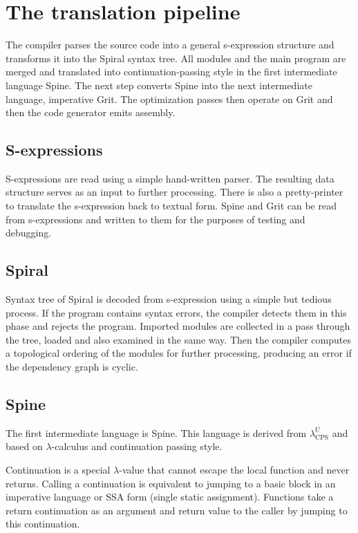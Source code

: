 \chapter{The translation pipeline}

The compiler parses the source code into a general s-expression structure and
transforms it into the Spiral syntax tree. All modules and the main program are
merged and translated into continuation-passing style in the first intermediate
language Spine. The next step converts Spine into the next intermediate
language, imperative Grit. The optimization passes then operate on Grit and then
the code generator emits assembly.

\section{S-expressions}

S-expressions are read using a simple hand-written parser. The resulting data
structure serves as an input to further processing. There is also a
pretty-printer to translate the s-expression back to textual form. Spine and
Grit can be read from s-expressions and written to them for the purposes of
testing and debugging.

\section{Spiral}

Syntax tree of Spiral is decoded from s-expression using a simple but tedious
process. If the program contains syntax errors, the compiler detects them in
this phase and rejects the program. Imported modules are collected in a pass
through the tree, loaded and also examined in the same way. Then the compiler
computes a topological ordering of the modules for further processing, producing
an error if the dependency graph is cyclic.

\section{Spine}

The first intermediate language is Spine. This language is derived from
$\lambda^U_\text{CPS}$ \cite{kennedy2007compiling} and based on
$\lambda$-calculus and continuation passing style.

Continuation is a special $\lambda$-value that cannot escape the local function
and never returns. Calling a continuation is equivalent to jumping to a basic
block in an imperative language or SSA form (single static assignment).
Functions take a return continuation as an argument and return value to the
caller by jumping to this continuation.

